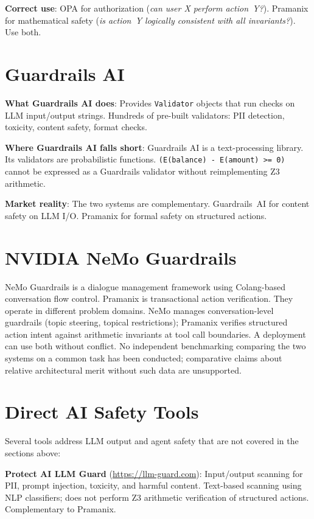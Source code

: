 \documentclass[12pt,a4paper,oneside]{report}
\newcommand{\code}[1]{\texttt{#1}}           %
\begin{document}
\textbf{Correct use}: OPA for authorization (\textit{can user X perform
action~Y?}). Pramanix for mathematical safety (\textit{is action~Y logically
consistent with all invariants?}). Use both.

\section{Guardrails AI}

\textbf{What Guardrails AI does}: Provides \code{Validator} objects that run
checks on LLM input/output strings. Hundreds of pre-built validators: PII
detection, toxicity, content safety, format checks.

\textbf{Where Guardrails AI falls short}: Guardrails AI is a text-processing
library. Its validators are probabilistic functions. \code{(E(balance) -
E(amount) >= 0)} cannot be expressed as a Guardrails validator without
reimplementing Z3 arithmetic.

\textbf{Market reality}: The two systems are complementary. Guardrails~AI for
content safety on LLM I/O. Pramanix for formal safety on structured actions.

\section{NVIDIA NeMo Guardrails}

NeMo Guardrails is a dialogue management framework using Colang-based
conversation flow control.  Pramanix is transactional action verification.
They operate in different problem domains.  NeMo manages conversation-level
guardrails (topic steering, topical restrictions); Pramanix verifies structured
action intent against arithmetic invariants at tool call boundaries.  A
deployment can use both without conflict.  No independent benchmarking
comparing the two systems on a common task has been conducted; comparative
claims about relative architectural merit without such data are unsupported.

\section{Direct AI Safety Tools}

Several tools address LLM output and agent safety that are not covered in the
sections above:

\textbf{Protect AI LLM Guard} (\url{https://llm-guard.com}): Input/output
scanning for PII, prompt injection, toxicity, and harmful content.  Text-based
scanning using NLP classifiers; does not perform Z3 arithmetic verification
of structured actions.  Complementary to Pramanix.
\end{document}

